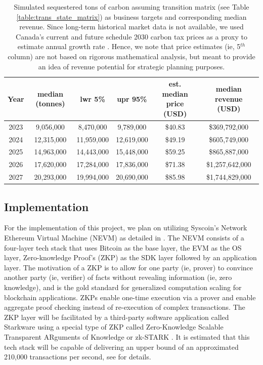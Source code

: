 \documentclass{article}
\begin{document}
\begin{table}[h]
\centering
\begin{tabular}{ |c|c|c|c|c|c| } 
\hline
 Year & median (tonnes) & lwr 5\% & upr 95\% & est. median price (USD)  & median revenue (USD)  \\
\hline
2023 & 9,056,000 & 8,470,000 & 9,789,000 & \$40.83 & \$369,792,000 \\
2024 & 12,315,000 & 11,959,000 & 12,619,000  & \$49.19 & \$605,749,000 \\
2025 & 14,963,000 & 14,443,000 & 15,448,000 & \$59.25 & \$865,887,000  \\
2026 & 17,620,000 & 17,284,000 & 17,836,000  & \$71.38 & \$1,257,642,000 \\
2027 & 20,293,000 & 19,994,000 & 20,690,000 & \$85.98 & \$1,744,829,000 \\
\hline
\end{tabular}
\caption{Simulated sequestered tons of carbon assuming transition matrix (see Table \ref{table:trans_state_matrix}) as business targets and corresponding median revenue. Since long-term historical market data is not available, we used Canada's current and future schedule 2030 carbon tax prices as a proxy to estimate annual growth rate \cite{Mck21}. Hence, we note that price estimates (ie, 5$^{th}$ column) are not based on rigorous mathematical analysis, but meant to provide an idea of revenue potential for strategic planning purposes.}
\label{table:sim_revenue}
\end{table}


\subsection{Implementation}

For the implementation of this project, we plan on utilizing Syscoin's Network Ethereum Virtual Machine (NEVM) as detailed in \cite{Sid21}. The NEVM consists of a four-layer tech stack that uses Bitcoin as the base layer, the EVM as the OS layer, Zero-knowledge Proof's (ZKP) as the SDK layer followed by an application layer. The motivation of a ZKP is to allow for one party (ie, prover) to convince another party (ie, verifier) of facts without revealing information (ie, zero knowledge), and is the gold standard for generalized computation scaling for blockchain applications. ZKPs enable one-time execution via a prover and enable aggregate proof checking instead of re-execution of complex transactions. The ZKP layer will be facilitated by a third-party software application called Starkware \cite{STA20} using a special type of ZKP called  Zero-Knowledge Scalable Transparent ARguments of Knowledge or zk-STARK \cite{Nas19}. It is estimated that this tech stack will be capable of delivering an upper bound of an approximated 210,000 transactions per second, see \cite{Sid21} for details.
\end{document}

